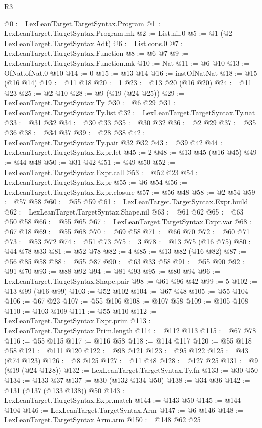 \begin{lexlean}{R3}
\begin{coremodule}
{{{{{{{{{{{@0 := LexLeanTarget.TargetSyntax.Program
@1 := LexLeanTarget.TargetSyntax.Program.mk
@2 := List.nil.{0}
@5 := @1 (@2 LexLeanTarget.TargetSyntax.Adt)
@6 := List.cons.{0}
@7 := LexLeanTarget.TargetSyntax.Function
@8 := @6 @7
@9 := LexLeanTarget.TargetSyntax.Function.mk
@10 := Nat
@11 := @6 @10
@13 := OfNat.ofNat.{0} @10
@14 := 0
@15 := @13 @14
@16 := instOfNatNat
@18 := @15 (@16 @14)
@19 := @11 @18
@20 := 1
@23 := @13 @20 (@16 @20)
@24 := @11 @23
@25 := @2 @10
@28 := @9 (@19 (@24 @25))
@29 := LexLeanTarget.TargetSyntax.Ty
@30 := @6 @29
@31 := LexLeanTarget.TargetSyntax.Ty.list
@32 := LexLeanTarget.TargetSyntax.Ty.nat
@33 := @31 @32
@34 := @30 @33
@35 := @30 @32
@36 := @2 @29
@37 := @35 @36
@38 := @34 @37
@39 := @28 @38
@42 := LexLeanTarget.TargetSyntax.Ty.pair @32 @32
@43 := @39 @42
@44 := LexLeanTarget.TargetSyntax.Expr.let
@45 := 2
@48 := @13 @45 (@16 @45)
@49 := @44 @48
@50 := @31 @42
@51 := @49 @50
@52 := LexLeanTarget.TargetSyntax.Expr.call
@53 := @52 @23
@54 := LexLeanTarget.TargetSyntax.Expr
@55 := @6 @54
@56 := LexLeanTarget.TargetSyntax.Expr.closure
@57 := @56 @48
@58 := @2 @54
@59 := @57 @58
@60 := @55 @59
@61 := LexLeanTarget.TargetSyntax.Expr.build
@62 := LexLeanTarget.TargetSyntax.Shape.nil
@63 := @61 @62
@65 := @63 @50 @58
@66 := @55 @65
@67 := LexLeanTarget.TargetSyntax.Expr.var
@68 := @67 @18
@69 := @55 @68
@70 := @69 @58
@71 := @66 @70
@72 := @60 @71
@73 := @53 @72
@74 := @51 @73
@75 := 3
@78 := @13 @75 (@16 @75)
@80 := @44 @78 @33
@81 := @52 @78
@82 := 4
@85 := @13 @82 (@16 @82)
@87 := @56 @85 @58
@88 := @55 @87
@90 := @63 @33 @58
@91 := @55 @90
@92 := @91 @70
@93 := @88 @92
@94 := @81 @93
@95 := @80 @94
@96 := LexLeanTarget.TargetSyntax.Shape.pair
@98 := @61 @96 @42
@99 := 5
@102 := @13 @99 (@16 @99)
@103 := @52 @102
@104 := @67 @48
@105 := @55 @104
@106 := @67 @23
@107 := @55 @106
@108 := @107 @58
@109 := @105 @108
@110 := @103 @109
@111 := @55 @110
@112 := LexLeanTarget.TargetSyntax.Expr.prim
@113 := LexLeanTarget.TargetSyntax.Prim.length
@114 := @112 @113
@115 := @67 @78
@116 := @55 @115
@117 := @116 @58
@118 := @114 @117
@120 := @55 @118 @58
@121 := @111 @120
@122 := @98 @121
@123 := @95 @122
@125 := @43 (@74 @123)
@126 := @8 @125
@127 := @11 @48
@128 := @127 @25
@131 := @9 (@19 (@24 @128))
@132 := LexLeanTarget.TargetSyntax.Ty.fn
@133 := @30 @50
@134 := @133 @37
@137 := @30 (@132 @134 @50)
@138 := @34 @36
@142 := @131 (@137 (@133 @138)) @50
@143 := LexLeanTarget.TargetSyntax.Expr.match
@144 := @143 @50
@145 := @144 @104
@146 := LexLeanTarget.TargetSyntax.Arm
@147 := @6 @146
@148 := LexLeanTarget.TargetSyntax.Arm.arm
@150 := @148 @62 @25
}}}}}}}}}}}
\end{coremodule}
\end{lexlean}
